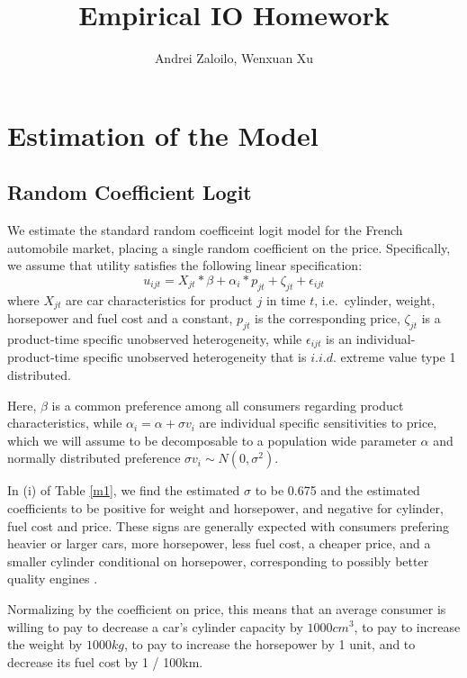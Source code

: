 \documentclass[a4paper,12pt]{article}
\begin{document}
\title{Empirical IO Homework}
\author{Andrei Zaloilo, Wenxuan Xu}
\maketitle

\section{Estimation of the Model}

\subsection{Random Coefficient Logit}

We estimate the standard random coefficeint logit model for the French automobile market, placing a single random coefficient on the price. Specifically, we assume that utility satisfies the following linear specification:
\begin{equation}
    u_{ijt} = X_{jt}*\beta + \alpha_{i} * p_{jt} + \zeta_{jt} + \epsilon_{ijt}
\end{equation}
where $X_{jt}$ are car characteristics for product $j$ in time $t$, i.e.\ cylinder, weight, horsepower and fuel cost and a constant, $p_{jt}$ is the corresponding price, $\zeta_{jt}$ is a product-time specific unobserved heterogeneity, while $\epsilon_{ijt}$ is an individual-product-time specific unobserved heterogeneity that is $i.i.d.$ extreme value type 1 distributed. 

Here, $\beta$ is a common preference among all consumers regarding product characteristics, while $\alpha_i = \alpha + \sigma v_i$ are individual specific sensitivities to price, which we will assume to be decomposable to a population wide parameter $\alpha$ and normally distributed preference $\sigma v_i \sim N(0, \sigma^2)$.

In (i) of Table \ref{m1}, we find the estimated $\sigma$ to be 0.675 and the estimated coefficients to be positive for weight and horsepower, and negative for cylinder, fuel cost and price. These signs are generally expected with consumers prefering heavier or larger cars, more horsepower, less fuel cost, a cheaper price, and a smaller cylinder conditional on horsepower, corresponding to possibly better quality engines .

Normalizing by the coefficient on price, this means that an average consumer is willing to pay  to decrease a car's cylinder capacity by $1000 cm^3$, to pay  to increase the weight by $1000 kg$, to pay  to increase the horsepower by 1 unit, and  to decrease its fuel cost by 1 \texteuro / 100km.
\end{document}
